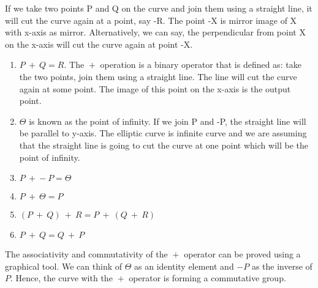 \documentclass[11pt]{article}
\begin{document}
If we take two points P and Q on the curve and join them using a straight line, it will cut the curve again at a point, say -R. The point -X is mirror image of X with x-axis as mirror. Alternatively, we can say, the perpendicular from point X on the x-axis will cut the curve again at point -X.
\begin{enumerate}
    \item $P \  \boxed{+}  \ Q = R$. The $\boxed{+}$ operation is a binary operator that is defined as: take the two points, join them using a straight line. The line will cut the curve again at some point. The image of this point on the x-axis is the output point.
    \item $\Theta$ is known as the point of infinity. If we join P and -P, the straight line will be parallel to y-axis. The elliptic curve is infinite curve and we are assuming that the straight line is going to cut the curve at one point which will be the point of infinity.
    \item $P \ \boxed{+} -P = \Theta$
    \item ${P \ \boxed{+} \ \Theta = P}$
    \item $(P \ \boxed{+} \ Q) \ \boxed{+} \ R = P \ \boxed{+} \ (Q \ \boxed{+} \ R)$
    \item $P \ \boxed{+} \ Q = Q \ \boxed{+} \ P$
    
\end{enumerate}
The associativity and commutativity of the $\boxed{+}$ operator can be proved using a graphical tool. We can think of $\Theta$ as an identity element and $-P$ as the inverse of $P$. Hence, the curve with the $\boxed{+}$ operator is forming a commutative group.\\
\end{document}
